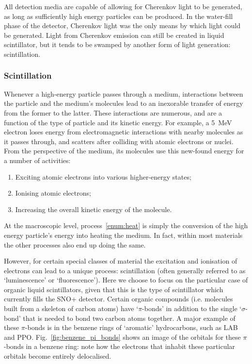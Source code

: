 All detection media are capable of allowing for Cherenkov light to be generated, as long as sufficiently high energy particles can be produced. In the water-fill phase of the detector, Cherenkov light was the only means by which light could be generated. Light from Cherenkov emission can still be created in liquid scintillator, but it tends to be swamped by another form of light generation: scintillation.
\subsubsection{Scintillation}
Whenever a high-energy particle passes through a medium, interactions between the particle and the medium's molecules lead to an inexorable transfer of energy from the former to the latter. These interactions are numerous, and are a function of the type of particle and its kinetic energy. For example, a \SI{5}{\MeV} electron loses energy from electromagnetic interactions with nearby molecules as it passes through, and scatters after colliding with atomic electrons or nuclei. From the perspective of the medium, its molecules use this new-found energy for a number of activities:
\begin{enumerate}
    \item Exciting atomic electrons into various higher-energy states;
    \item Ionising atomic electrons;
    \item Increasing the overall kinetic energy of the molecule.\label{enum:heat}
\end{enumerate}
At the macroscopic level, process~\ref{enum:heat} is simply the conversion of the high energy particle's energy into heating the medium. In fact, within most materials the other processes also end up doing the same.

However, for certain special classes of material the excitation and ionisation of electrons can lead to a unique process: scintillation (often generally referred to as `luminescence' or `fluorescence'). Here we choose to focus on the particular case of organic liquid scintillators, given that this is the type of scintillator which currently fills the SNO+ detector. Certain organic compounds (i.e. molecules built from a skeleton of carbon atoms) have `$\pi$-bonds' in addition to the single `$\sigma$-bond' that is needed to bond two carbon atoms together. A major example of these $\pi$-bonds is in the benzene rings of `aromatic' hydrocarbons, such as LAB and PPO. Fig.~\ref{fig:benzene_pi_bonds} shows an image of the orbitals for these $\pi$-bonds in a benzene ring: note how the electrons that inhabit these particular orbitals become entirely delocalised.

